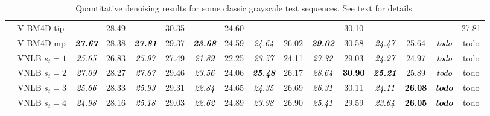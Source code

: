 \documentclass[10pt, journal, twocolumn, final, a4paper]{IEEEtran}
\newcommand{\bsic}[1]{\textcolor{black}{\textit{#1}}}
\newcommand{\Bsic}[1]{\textcolor{black}{\textbf{\textit{#1}}}}
\newcommand{\Best}[1]{\textbf{\textcolor{black}{#1}}}
\begin{document}
\begin{table}[htp!]
\begin{center}
{\begin{tabular}{ c | l |c c | c c | c c | c c | c c | c c | c c}
			                      & V-BM4D-tip           & \bsic{     } &       28.49  & \bsic{     } &       30.35   & \bsic{     } &       24.60   &              &              &              &       30.10   &              &              & \bsic{     } &       27.81  \\
			                      & V-BM4D-mp            & \Bsic{27.67} &       28.38  & \Bsic{27.81} &       29.37   & \Bsic{23.68} &       24.59   & \bsic{24.64} &       26.02  & \Bsic{29.02} &       30.58   & \bsic{24.47} &       25.64  & \bsic{todo } &       todo   \\
			                      & VNLB   $s_t = 1$     & \bsic{25.65} &       26.83  & \bsic{25.97} &       27.49   & \bsic{21.89} &       22.25   & \bsic{23.57} &       24.11  & \bsic{27.32} &       29.03   & \bsic{24.27} &       24.97  & \bsic{todo } &       todo   \\
										 & VNLB   $s_t = 2$     & \bsic{27.09} &       28.27  & \bsic{27.67} &       29.46   & \bsic{23.56} &       24.06   & \Bsic{25.48} &       26.17  & \bsic{28.64} & \Best{30.90}  & \Bsic{25.21} &       25.89  & \bsic{todo } &       todo   \\
										 & VNLB   $s_t = 3$     & \bsic{25.66} &       28.33  & \bsic{25.93} &       29.31   & \bsic{22.84} &       24.65   & \bsic{24.35} &       26.69  & \bsic{26.31} &       30.11   & \bsic{24.11} & \Best{26.08} & \Bsic{todo } &       todo   \\
			                      & VNLB   $s_t = 4$     & \bsic{24.98} &       28.16  & \bsic{25.18} &       29.03   & \bsic{22.62} &       24.89   & \bsic{23.98} &       26.90  & \bsic{25.41} &       29.59   & \bsic{23.64} & \Best{26.05} & \Bsic{todo } &       todo   \\\hline
		\end{tabular}}
	\end{center}
	\caption{Quantitative denoising results for some classic grayscale test sequences. See text for details.}
	\label{tab:psnr-classic-gray}
\end{table}
\end{document}
